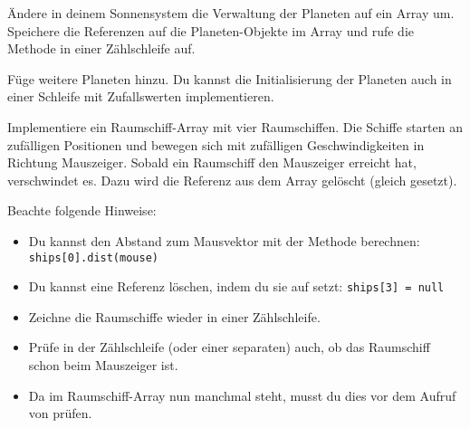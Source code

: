 \documentclass[9pt, a4paper]{arbeitsblatt}
\begin{document}

\begin{aufgabe}[icon=\iconComputer]
\begin{teilaufgaben}
	\teilaufgabe
	Ändere in deinem Sonnensystem die Verwaltung der Planeten auf ein Array um. Speichere die Referenzen auf die Planeten-Objekte im Array und rufe die  Methode in einer Zählschleife auf.

	\teilaufgabe
	Füge weitere Planeten hinzu. Du kannst die Initialisierung der Planeten auch in einer Schleife mit Zufallswerten implementieren.

	\teilaufgabe
	Implementiere ein Raumschiff-Array mit vier Raumschiffen. Die Schiffe starten an zufälligen Positionen und bewegen sich mit zufälligen Geschwindigkeiten in Richtung Mauszeiger. Sobald ein Raumschiff den Mauszeiger erreicht hat, verschwindet es. Dazu wird die Referenz aus dem Array gelöscht (gleich  gesetzt).

	Beachte folgende Hinweise:
	\begin{itemize}
		\item Du kannst den Abstand zum Mausvektor mit der Methode  berechnen: \texttt{ships[0].dist(mouse)}
		\item Du kannst eine Referenz löschen, indem du sie auf  setzt: \texttt{ships[3] = null}
		\item Zeichne die Raumschiffe wieder in einer Zählschleife.
		\item Prüfe in der Zählschleife (oder einer separaten)  auch, ob das Raumschiff schon beim Mauszeiger ist.
		\item Da im Raumschiff-Array nun manchmal  steht, musst du dies vor dem Aufruf von  prüfen.
	\end{itemize}
\end{teilaufgaben}
\end{aufgabe}
\end{document}
